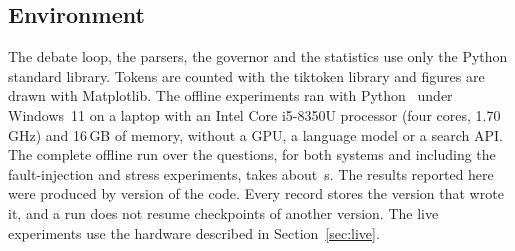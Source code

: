 \subsection{Environment}
The debate loop, the parsers, the governor and the statistics use only the Python standard library. Tokens are counted with the tiktoken library and figures are drawn with Matplotlib. The offline experiments ran with Python~\VPython{} under Windows~11 on a laptop with an Intel Core i5-8350U processor (four cores, 1.70\,GHz) and 16\,GB of memory, without a GPU, a language model or a search API. The complete offline run over the \VNQuestions{} questions, for both systems and including the fault-injection and stress experiments, takes about \VElapsed\,s. The results reported here were produced by version \VCodeVersion{} of the code. Every record stores the version that wrote it, and a run does not resume checkpoints of another version. The live experiments use the hardware described in Section~\ref{sec:live}.
